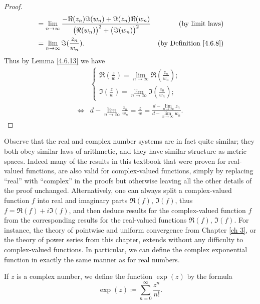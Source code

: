 \begin{proof}
\begin{align*}
                         & = \lim_{n \to \infty} \frac{- \Re(z_n) \Im(w_n) + \Im(z_n) \Re(w_n)}{\big(\Re(w_n)\big)^2 + \big(\Im(w_n)\big)^2} & \text{(by limit laws)}             \\
                         & = \lim_{n \to \infty} \Im(\frac{z_n}{w_n}).                                                                       & \text{(by Definition \ref{4.6.8})}
    \end{align*}
    Thus by Lemma \ref{4.6.13} we have
    \begin{align*}
             & \begin{cases}
            \Re(\frac{z}{w}) = \lim_{n \to \infty} \Re(\frac{z_n}{w_n}); \\
            \Im(\frac{z}{w}) = \lim_{n \to \infty} \Im(\frac{z_n}{w_n});
        \end{cases}                                                                                               \\
        \iff & d - \lim_{n \to \infty} \frac{z_n}{w_n} = \frac{z}{w} = \frac{d - \lim_{n \to \infty} z_n}{d - \lim_{n \to \infty} w_n}.
    \end{align*}
\end{proof}

\begin{note}
    Observe that the real and complex number systems are in fact quite similar;
    they both obey similar laws of arithmetic, and they have similar structure as metric spaces.
    Indeed many of the results in this textbook that were proven for real-valued functions, are also valid for complex-valued functions, simply by replacing ``real'' with ``complex'' in the proofs but otherwise leaving all the other details of the proof unchanged.
    Alternatively, one can always split a complex-valued function \(f\) into real and imaginary parts \(\Re(f)\), \(\Im(f)\), thus \(f = \Re(f) + i \Im(f)\), and then deduce results for the complex-valued function \(f\) from the corresponding results for the real-valued functions \(\Re(f)\), \(\Im(f)\).
    For instance, the theory of pointwise and uniform convergence from Chapter \ref{ch 3}, or the theory of power series from this chapter, extends without any difficulty to complex-valued functions.
    In particular, we can define the complex exponential function in exactly the same manner as for real numbers.
\end{note}

\begin{definition}\label{4.6.15}
    If \(z\) is a complex number, we define the function \(\exp(z)\) by the formula
    \[
        \exp(z) \coloneqq \sum_{n = 0}^\infty \frac{z^n}{n!}.
    \]
\end{definition}

